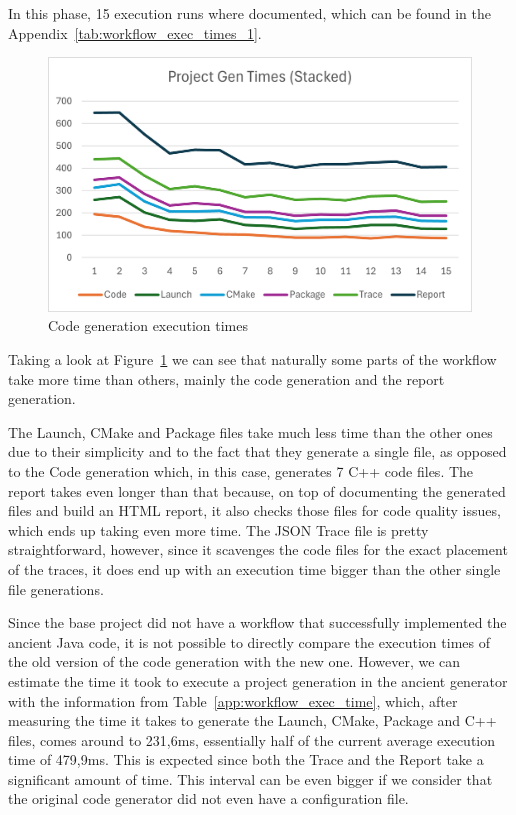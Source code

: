 In this phase, 15 execution runs where documented, which can be found in the Appendix~\ref{tab:workflow_exec_times_1}.

\begin{figure}[htbp]
	\centering
	\includegraphics[width=\textwidth]{exec_times1.png}
	\caption{Code generation execution times}
	\label{fig:exec_times_1}
\end{figure}

Taking a look at Figure~\ref{fig:exec_times_1} we can see that naturally some parts of the workflow take more time than others, mainly the code generation and the report generation.

The Launch, CMake and Package files take much less time than the other ones due to their simplicity and to the fact that they generate a single file, as opposed to the Code generation which, in this case, generates 7 C++ code files. The report takes even longer than that because, on top of documenting the generated files and build an HTML report, it also checks those files for code quality issues, which ends up taking even more time. The JSON Trace file is pretty straightforward, however, since it scavenges the code files for the exact placement of the traces, it does end up with an execution time bigger than the other single file generations.

Since the base project did not have a workflow that successfully implemented the ancient Java code, it is not possible to directly compare the execution times of the old version of the code generation with the new one. However, we can estimate the time it took to execute a project generation in the ancient generator with the information from Table~\ref{app:workflow_exec_time}, which, after measuring the time it takes to generate the Launch, CMake, Package and C++ files, comes around to 231,6ms, essentially half of the current average execution time of 479,9ms. This is expected since both the Trace and the Report take a significant amount of time. This interval can be even bigger if we consider that the original code generator did not even have a configuration file.

